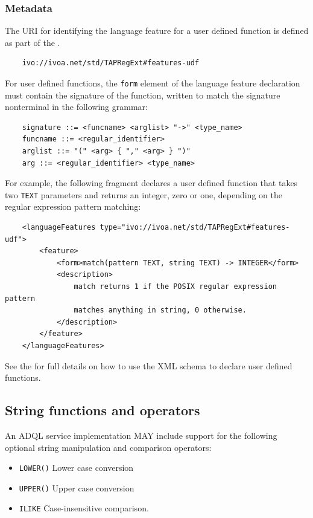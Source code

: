 \documentclass[11pt,a4paper]{ivoa}
\begin{document}
\subsubsection{Metadata}
\label{sec:user.metadata}

The URI for identifying the language feature for a user defined function
is defined as part of the \TAPRegSpec{}.

\begin{verbatim}
    ivo://ivoa.net/std/TAPRegExt#features-udf
\end{verbatim}

For user defined functions, the \verb:form: element of the language feature
declaration must contain the signature of the function, written to match
the signature nonterminal in the following grammar:
\begin{verbatim}
    signature ::= <funcname> <arglist> "->" <type_name>
    funcname ::= <regular_identifier>
    arglist ::= "(" <arg> { "," <arg> } ")"
    arg ::= <regular_identifier> <type_name>
\end{verbatim}

For example, the following fragment declares a user defined function that
takes two \verb:TEXT: parameters and returns an integer, zero or one,
depending on the regular expression pattern matching:
\begin{verbatim}
    <languageFeatures type="ivo://ivoa.net/std/TAPRegExt#features-udf">
        <feature>
            <form>match(pattern TEXT, string TEXT) -> INTEGER</form>
            <description>
                match returns 1 if the POSIX regular expression pattern
                matches anything in string, 0 otherwise.
            </description>
        </feature>
    </languageFeatures>
\end{verbatim}

See the \TAPRegSpec{} for full details on how to use the
XML schema to declare user defined functions.

\subsection{String functions and operators}
\label{sec:string.functions}

An ADQL service implementation MAY include support for the following optional
string manipulation and comparison operators:

\begin{itemize}
    \item \verb:LOWER(): Lower case conversion
    \item \verb:UPPER(): Upper case conversion
    \item \verb:ILIKE: Case-insensitive comparison.
\end{itemize}
\end{document}
